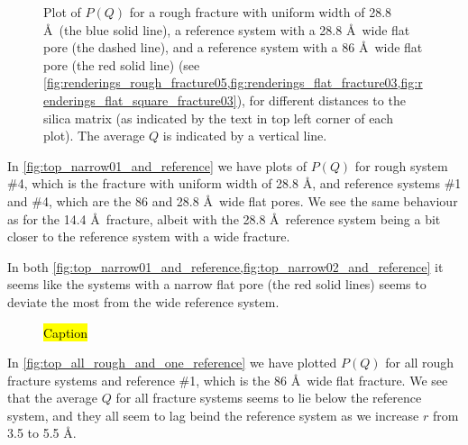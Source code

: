 %
\begin{figure}[!p]%
    \centering%
    {%
        \captionsetup{width=\textwidth}%
        \caption{%
            Plot of $P(Q)$ for a rough fracture with uniform width of 28.8 \AA\ (the blue solid line), a reference system with a 28.8 \AA\ wide flat pore (the dashed line), and a reference system with a 86 \AA\ wide flat pore (the red solid line) (see \cref{fig:renderings_rough_fracture05,fig:renderings_flat_fracture03,fig:renderings_flat_square_fracture03}), for different distances to the silica matrix (as indicated by the text in top left corner of each plot). The average $Q$ is indicated by a vertical line. %
            \label{fig:top_narrow02_and_reference}%
        }%
    }%
\end{figure}%

In \cref{fig:top_narrow01_and_reference} we have plots of $P(Q)$ for rough system \#4, which is the fracture with uniform width of 28.8 \AA, and reference systems \#1 and \#4, which are the 86 and 28.8 \AA\ wide flat pores. We see the same behaviour as for the 14.4 \AA\ fracture, albeit with the 28.8 \AA\ reference system being a bit closer to the reference system with a wide fracture.

In both \cref{fig:top_narrow01_and_reference,fig:top_narrow02_and_reference} it seems like the systems with a narrow flat pore (the red solid lines) seems to deviate the most from the wide reference system.

%
\begin{figure}[htpb]%
    \centering%
    {%
        \caption{%
            \hl{Caption} %
            \label{fig:top_all_rough_and_one_reference}%
            \label{fig:last_top_figure}%
        }%
    }%
\end{figure}%

In \cref{fig:top_all_rough_and_one_reference} we have plotted $P(Q)$ for all rough fracture systems and reference \#1, which is the 86 \AA\ wide flat fracture. We see that the average $Q$ for all fracture systems seems to lie below the reference system, and they all seem to lag beind the reference system as we increase $r$ from 3.5 to 5.5 \AA.